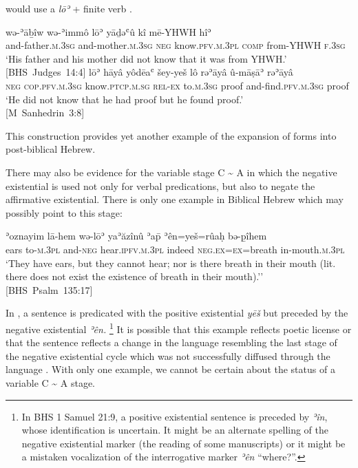 \documentclass[output=paper,colorlinks,citecolor=brown,draft,draftmode]{langscibook}
\begin{document}
would use a \textit{lōʾ} + finite verb .
%
\begin{exe}\ex\begin{xlist}
\ex\label{ex:heb-father-and-mother}
\gll wə-ʾāḇîw wə-ʾimmô lōʾ yāḏəʿû kî mē-YHWH hîʾ \\ 
and-father.\textsc{m.3sg}  and-mother.\textsc{m.3sg} \textsc{neg}
know.\textsc{pfv.m.3pl}  \textsc{comp}   from-YHWH \textsc{f.3sg} \\
\glt `His father and his mother did not know that it was from YHWH.'\\
\mbox{[BHS Judges 14:4]}
%
\ex\label{ex:heb-found-proof}
 \gll lōʾ hāyâ yôdēaʿ šey-yeš lô rəʾāyâ û-māṣāʾ rəʾāyâ \\
\textsc{neg} \textsc{cop.pfv.m.3sg} know.\textsc{ptcp.m.sg} \textsc{rel-ex}
to.\textsc{m.3sg}   proof and-find.\textsc{pfv.m.3sg}   proof   \\
\glt `He did not know that he had proof but he found proof.'\\
\mbox{[M Sanhedrin 3:8]}
\end{xlist}\end{exe}
%
This construction provides yet another example of the expansion of forms into post-biblical Hebrew.

There may also be evidence for the variable stage C {\textasciitilde} A in which the negative existential is used not only for verbal predications, but also to negate the affirmative existential. There is only one example in Biblical Hebrew which may possibly point to this stage:
%
\begin{exe}\ex \label{ex:heb-ears}
    \gll ʾoznayim lā-hem wə-lōʾ yaʾăzînû ʾa\={p} ʾên=yeš=rûaḥ bə-p̱îhem \\
ears    to-\textsc{m.3pl}  and-\textsc{neg}  hear.\textsc{ipfv.m.3pl}   indeed 
  \textsc{neg.ex=ex}=breath  in-mouth.\textsc{m.3pl} \\
    \glt
`They have ears, but they cannot hear; nor is there breath in their mouth
(lit. there does not exist the existence of breath in their mouth).''\\
\mbox{[BHS Psalm 135:17]}
    \end{exe}
%
In , a sentence is predicated with the positive
existential \textit{yēš} but preceded by the negative existential
\textit{ʾên.}%
%
    \footnote{In BHS 1 Samuel 21:9, a positive existential
    sentence is preceded by \textit{ʾîn}, whose identification is uncertain. It
    might be an alternate spelling of the negative existential marker (the
    reading of some manuscripts) or it might be a mistaken vocalization of the
    interrogative marker \textit{ʾên} ``where?''.} %
%
It is possible that this
example reflects poetic license or that the sentence reflects a change in
the language resembling the last stage of the negative existential cycle
which was not successfully diffused through the language \parencite[see][]%
{Naude2012}. With only one example, we cannot be certain about the
status of  a variable C {\textasciitilde} A stage.
\end{document}
